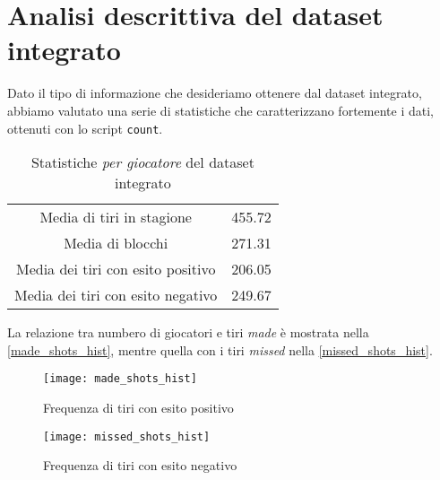 \pagebreak
\section{Analisi descrittiva del dataset integrato}

Dato il tipo di informazione che desideriamo ottenere dal dataset integrato, abbiamo valutato una serie di statistiche che caratterizzano fortemente i dati, ottenuti con lo script \texttt{count}.

\begin{table}[h!]
\centering
	\begin{tabular}{c c} 
	 
		Media di tiri in stagione& 455.72 \\
		Media di blocchi& 271.31 \\
		Media dei tiri con esito positivo& 206.05\\
		Media dei tiri con esito negativo& 249.67\\
		\end{tabular}
		\caption{Statistiche \textit{per giocatore} del dataset integrato}
\end{table}

La relazione tra numbero di giocatori e tiri \textit{made} è mostrata nella \autoref{made_shots_hist}, mentre quella con i tiri \textit{missed} nella \autoref{missed_shots_hist}.

\begin{figure}
\caption{Frequenza di tiri con esito positivo}
\label{made_shots_hist}
\texttt{[image: made\_shots\_hist]}
\end{figure}

\begin{figure}
\caption{Frequenza di tiri con esito negativo}
\label{missed_shots_hist}
\texttt{[image: missed\_shots\_hist]}
\end{figure}
